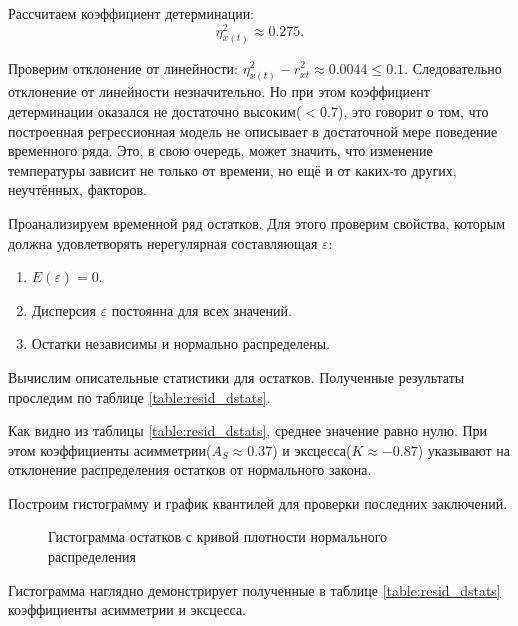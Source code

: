 Рассчитаем коэффициент детерминации:
\begin{equation*}
	\eta_{x(t)}^2 \approx 0.275.
\end{equation*}

Проверим отклонение от линейности: $\eta_{x(t)}^2 - r_{xt}^{2} \approx 0.0044 \le 0.1$. Следовательно отклонение от линейности незначительно. Но при этом коэффициент детерминации оказался не достаточно высоким($<0.7$), это говорит о том, что построенная регрессионная модель не описывает в достаточной мере поведение временного ряда. Это, в свою очередь, может значить, что изменение температуры зависит не только от времени, но ещё и от каких-то других, неучтённых, факторов.

Проанализируем временной ряд остатков. Для этого проверим свойства, которым должна удовлетворять нерегулярная составляющая $\varepsilon$:
\begin{enumerate}
	\item $E(\varepsilon) = 0$.
	\item Дисперсия $\varepsilon$ постоянна для всех значений.
	\item Остатки независимы и нормально распределены.
\end{enumerate}
Вычислим описательные статистики для остатков. Полученные результаты проследим по таблице \ref{table:resid_dstats}.


Как видно из таблицы \ref{table:resid_dstats}, среднее значение равно нулю. При этом коэффициенты асимметрии($A_S \approx 0.37$) и эксцесса($K \approx -0.87$) указывают на отклонение распределения остатков от нормального закона. 

Построим гистограмму и график квантилей для проверки последних заключений.
\begin{figure}[ht]
\caption{Гистограмма остатков с кривой плотности нормального распределения}
\label{img:resid_hist}
\end{figure}
Гистограмма наглядно демонстрирует полученные в таблице \ref{table:resid_dstats} коэффициенты асимметрии и эксцесса. 

